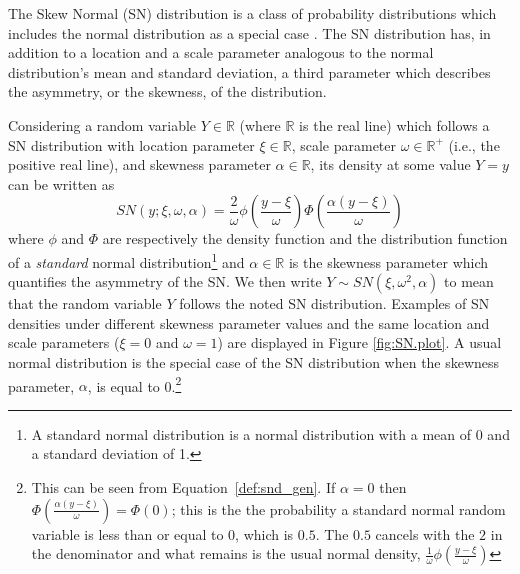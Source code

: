 \documentclass[11pt, oneside]{article}
\begin{document}
The Skew Normal (SN) distribution is a class of probability distributions which includes the normal distribution as a special case \citep{Azzalini1985}. The SN distribution has, in addition to a location and a scale parameter analogous to the normal distribution's mean and standard deviation, a third parameter which describes the asymmetry, or the skewness, of the distribution.  


Considering a random variable $Y\in \mathbb R$ (where $\mathbb R$ is the real line) which follows a SN distribution with location parameter $\xi \in \mathbb R$, scale parameter $\omega \in \mathbb R^{+}$ (i.e., the positive real line), and skewness parameter $\alpha \in \mathbb R$, its density at some value $Y = y$ can be written as 
\begin{equation} \label{def:snd_gen}
SN(y;\xi, \omega, \alpha) = \frac{2}{\omega} \phi\left(\frac{y-\xi}{\omega}\right) \Phi\left(\frac{\alpha(y-\xi)}{\omega}\right)
\end{equation}
where $\phi$ and $\Phi$ are respectively the density function and the distribution function of a \emph{standard} normal distribution\footnote{A standard normal distribution is a normal distribution with a mean of 0 and a standard deviation of 1.}
 and $\alpha \in \mathbb R$ is the skewness parameter which quantifies the asymmetry of the SN.  We then write $Y \sim SN(\xi, \omega^{2}, \alpha)$ to mean that the random variable $Y$ follows the noted SN distribution.
Examples of SN densities under different skewness parameter values and the same location and scale parameters ($\xi = 0$ and $\omega = 1$) are displayed in Figure \ref{fig:SN.plot}.  A usual normal distribution is the special case of the SN distribution when the skewness parameter, $\alpha$, is equal to 0.\footnote{This can be seen from Equation~\eqref{def:snd_gen}.  If $\alpha = 0$ then $\Phi\left(\frac{\alpha(y-\xi)}{\omega}\right) = \Phi(0)$; this is the the probability a standard normal random variable is less than or equal to 0, which is $0.5$.  The $0.5$ cancels with the $2$ in the denominator and what remains is the usual normal density, $\frac{1}{\omega} \phi\left(\frac{y-\xi}{\omega}\right)$}
%
\end{document}
